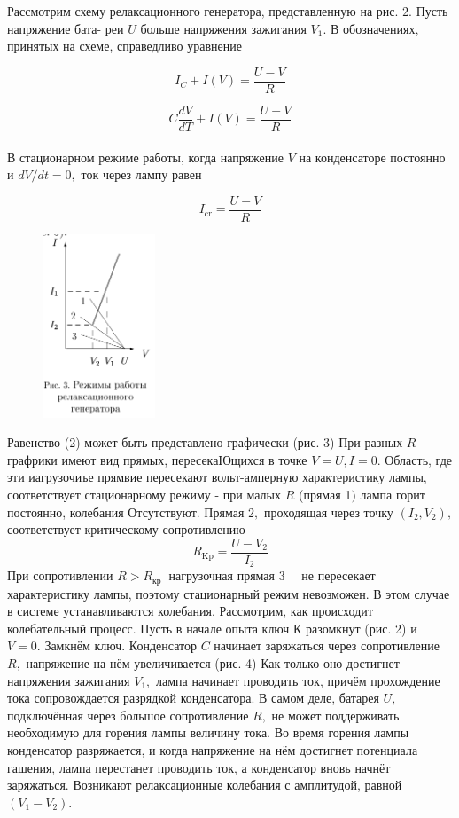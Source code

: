 \documentclass[a4paper, 12pt]{article}%
\begin{document}
Рассмотрим схему релаксационного генератора, представленную на рис. $2 .$ Пусть напряжение бата- реи $U$ больше напряжения зажигания $V_{1} .$ В обозначениях, принятых на схеме, справедливо уравнение

$$I_{C}+I(V)=\frac{U-V}{R}$$

$$C \frac{d V}{d T}+I(V)=\frac{U-V}{R}$$
\\

В стационарном режиме работы, когда напряжение $V$ на конденсаторе постоянно и $d V / d t=0,$ ток через лампу равен

$$I_{\mathrm{cr}}=\frac{U-V}{R}$$

\begin{figure} 
\begin{center}
\includegraphics[width=0.3\textwidth]{./ann/3.PNG} 
\end{center}
\end{figure}

Равенство (2) может быть представлено графически (рис. 3) При разных $R$ графрики имеют вид прямых, пересекаЮщихся в точке $V=U, I=0 .$ Область, где эти иагрузочиъе прямвие пересекают вольт-амперную характеристику лампы, соответствует стационарному режиму - при малых $R$ (прямая 1$)$ лампа горит постоянно, колебания Отсутствуют. Прямая $2,$ проходящая через точку $\left(I_{2}, V_{2}\right),$ соответствует критическому сопротивлению
$$
R_{\mathrm{Kp}}=\frac{U-V_{2}}{I_{2}}
$$
При сопротивлении $R>R_{\text {кр }}$ нагрузочная прямая $3 \quad$ не пересекает характеристику лампы, поэтому стационарный режим невозможен. В этом случае в системе устанавливаются колебания. Рассмотрим, как происходит колебательный процесс. Пусть в начале опыта ключ К разомкнут (рис. 2) и $V=0 .$ Замкнём ключ. Конденсатор $C$ начинает заряжаться через сопротивление $R,$ напряжение на нём увеличивается (рис. 4) Как только оно достигнет напряжения зажигания $V_{1},$ лампа начинает проводить ток, причём прохождение тока сопровождается разрядкой конденсатора. В самом деле, батарея $U,$ подключённая через большое сопротивление $R,$ не может поддерживать необходимую для горения лампы величину тока. Во время горения лампы конденсатор разряжается, и когда напряжение на нём достигнет потенциала гашения, лампа перестанет проводить ток, а конденсатор вновь начнёт заряжаться. Возникают релаксационные колебания с амплитудой, равной $\left(V_{1}-V_{2}\right) .$
\end{document}
